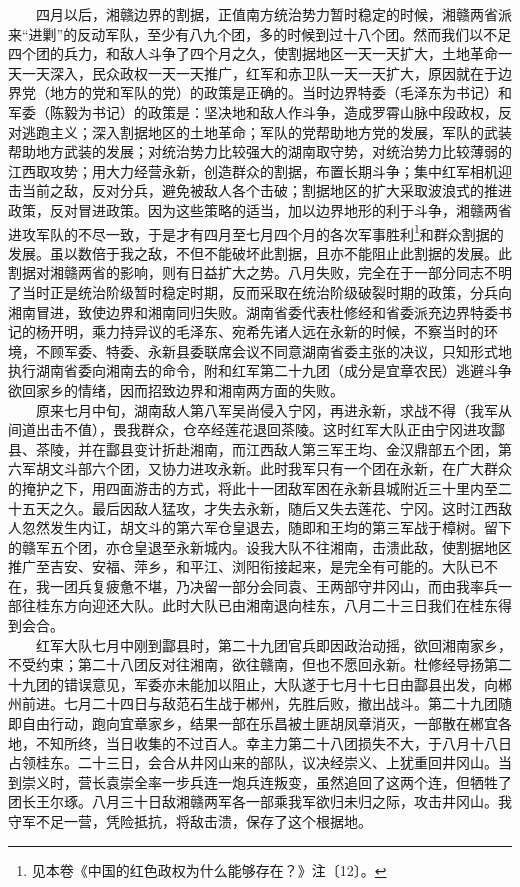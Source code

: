 \documentclass[cn,11pt,chinese]{elegantbook}
\begin{document}
　　四月以后，湘赣边界的割据，正值南方统治势力暂时稳定的时候，湘赣两省派来“进剿”的反动军队，至少有八九个团，多的时候到过十八个团。然而我们以不足四个团的兵力，和敌人斗争了四个月之久，使割据地区一天一天扩大，土地革命一天一天深入，民众政权一天一天推广，红军和赤卫队一天一天扩大，原因就在于边界党（地方的党和军队的党）的政策是正确的。当时边界特委（毛泽东为书记）和军委（陈毅为书记）的政策是：坚决地和敌人作斗争，造成罗霄山脉中段政权，反对逃跑主义；深入割据地区的土地革命；军队的党帮助地方党的发展，军队的武装帮助地方武装的发展；对统治势力比较强大的湖南取守势，对统治势力比较薄弱的江西取攻势；用大力经营永新，创造群众的割据，布置长期斗争；集中红军相机迎击当前之敌，反对分兵，避免被敌人各个击破；割据地区的扩大采取波浪式的推进政策，反对冒进政策。因为这些策略的适当，加以边界地形的利于斗争，湘赣两省进攻军队的不尽一致，于是才有四月至七月四个月的各次军事胜利\footnote[6]{ 见本卷《中国的红色政权为什么能够存在？》注〔12〕。}和群众割据的发展。虽以数倍于我之敌，不但不能破坏此割据，且亦不能阻止此割据的发展。此割据对湘赣两省的影响，则有日益扩大之势。八月失败，完全在于一部分同志不明了当时正是统治阶级暂时稳定时期，反而采取在统治阶级破裂时期的政策，分兵向湘南冒进，致使边界和湘南同归失败。湖南省委代表杜修经和省委派充边界特委书记的杨开明，乘力持异议的毛泽东、宛希先诸人远在永新的时候，不察当时的环境，不顾军委、特委、永新县委联席会议不同意湖南省委主张的决议，只知形式地执行湖南省委向湘南去的命令，附和红军第二十九团（成分是宜章农民）逃避斗争欲回家乡的情绪，因而招致边界和湘南两方面的失败。\\
　　原来七月中旬，湖南敌人第八军吴尚侵入宁冈，再进永新，求战不得（我军从间道出击不值），畏我群众，仓卒经莲花退回茶陵。这时红军大队正由宁冈进攻酃县、茶陵，并在酃县变计折赴湘南，而江西敌人第三军王均、金汉鼎部五个团，第六军胡文斗部六个团，又协力进攻永新。此时我军只有一个团在永新，在广大群众的掩护之下，用四面游击的方式，将此十一团敌军困在永新县城附近三十里内至二十五天之久。最后因敌人猛攻，才失去永新，随后又失去莲花、宁冈。这时江西敌人忽然发生内讧，胡文斗的第六军仓皇退去，随即和王均的第三军战于樟树。留下的赣军五个团，亦仓皇退至永新城内。设我大队不往湘南，击溃此敌，使割据地区推广至吉安、安福、萍乡，和平江、浏阳衔接起来，是完全有可能的。大队已不在，我一团兵复疲惫不堪，乃决留一部分会同袁、王两部守井冈山，而由我率兵一部往桂东方向迎还大队。此时大队已由湘南退向桂东，八月二十三日我们在桂东得到会合。\\
　　红军大队七月中刚到酃县时，第二十九团官兵即因政治动摇，欲回湘南家乡，不受约束；第二十八团反对往湘南，欲往赣南，但也不愿回永新。杜修经导扬第二十九团的错误意见，军委亦未能加以阻止，大队遂于七月十七日由酃县出发，向郴州前进。七月二十四日与敌范石生战于郴州，先胜后败，撤出战斗。第二十九团随即自由行动，跑向宜章家乡，结果一部在乐昌被土匪胡凤章消灭，一部散在郴宜各地，不知所终，当日收集的不过百人。幸主力第二十八团损失不大，于八月十八日占领桂东。二十三日，会合从井冈山来的部队，议决经崇义、上犹重回井冈山。当到崇义时，营长袁崇全率一步兵连一炮兵连叛变，虽然追回了这两个连，但牺牲了团长王尔琢。八月三十日敌湘赣两军各一部乘我军欲归未归之际，攻击井冈山。我守军不足一营，凭险抵抗，将敌击溃，保存了这个根据地。\\
\end{document}
